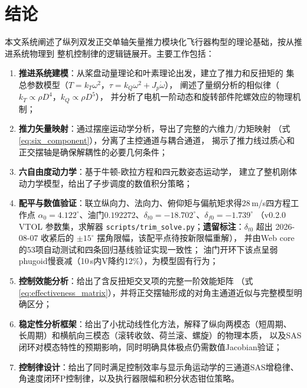 \section{结论}
\label{sec:conclusion}

本文系统阐述了纵列双发正交单轴矢量推力模块化飞行器构型的理论基础，按从推进系统物理到
整机控制律的逻辑链展开。主要工作包括：

\begin{enumerate}[label=(\arabic*)]
    \item \textbf{推进系统建模}：从桨盘动量理论和叶素理论出发，建立了推力和反扭矩的
          集总参数模型（$T = k_T\omega^2$，$\tau = k_Q\omega^2 + J_p\dot{\omega}$），
          阐述了量纲分析的相似律（$k_T \propto \rho D^4$，$k_Q \propto \rho D^5$），
          并分析了电机一阶动态和旋转部件陀螺效应的物理机制；
    \item \textbf{推力矢量映射}：通过摆座运动学分析，导出了完整的六维力/力矩映射
          （式\ref{eq:six_component}），分离了主控通道与耦合通道，
          揭示了推力线过质心和正交摆轴是确保解耦性的必要几何条件；
    \item \textbf{六自由度动力学}：基于牛顿-欧拉方程和四元数姿态运动学，
          建立了整机刚体动力学模型，给出了子步调度的数值积分策略；
    \item \textbf{配平与数值验证}：联立纵向力、法向力、俯仰矩与偏航矩求得28\,m/s四方程工作点
          $\alpha_0=4.122^\circ$、油门$0.192272$、$\delta_{t0}=-18.702^\circ$、$\delta_{f0}=-1.739^\circ$
          （v0.2.0 VTOL 参数集，求解器 \texttt{scripts/trim\_solve.py}；\textbf{遗留标注}：$\delta_{t0}$ 超出 2026-08-07 收紧后的 $\pm15^\circ$ 摆角限幅，该配平点待按新限幅重解），
          并由Web core的53项自动测试和四条回归基线验证实现一致性；
          油门开环下该点呈弱phugoid慢衰减（10\,s内V降约12\%），为模型固有行为；
    \item \textbf{控制效能分析}：给出了含反扭矩交叉项的完整一阶效能矩阵
          （式\ref{eq:effectiveness_matrix}），并将正交摆轴形成的对角主通道近似与完整模型明确区分；
    \item \textbf{稳定性分析框架}：给出了小扰动线性化方法，解释了纵向两模态（短周期、
          长周期）和横航向三模态（滚转收敛、荷兰滚、螺旋）的物理本质，
          以及SAS闭环对模态特性的预期影响，同时明确具体极点仍需数值Jacobian验证；
    \item \textbf{控制律设计}：给出了同时满足控制效率与显示角运动学的三通道SAS增稳律、
          角速度闭环P控制律，以及执行器限幅和积分状态钳位策略。
\end{enumerate}

